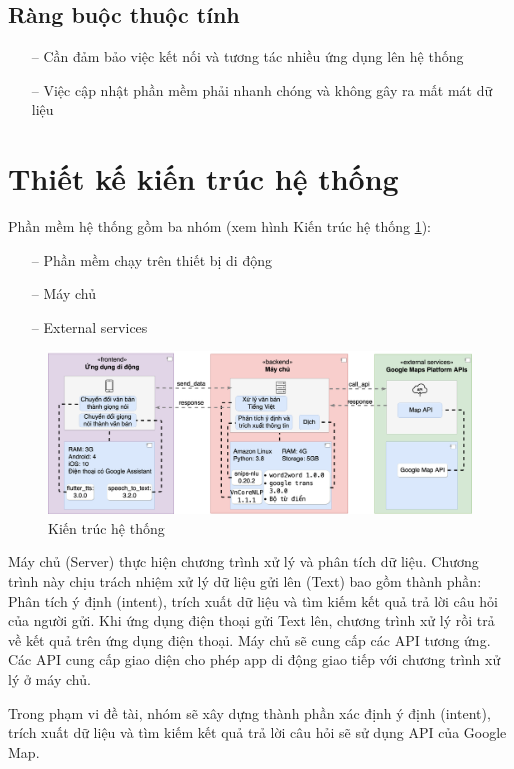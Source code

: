\subsection{Ràng buộc thuộc tính}
\begin{itemize}
    \item[--] Cần đảm bảo việc kết nối và tương tác nhiều ứng dụng lên hệ thống
    \item[--] Việc cập nhật phần mềm phải nhanh chóng và không gây ra mất mát dữ liệu
\end{itemize}

\section{Thiết kế kiến trúc hệ thống}
Phần mềm hệ thống gồm ba nhóm (xem hình Kiến trúc hệ thống \ref{fig:kien-truc-he-thong}):
\begin{itemize}
    \item[--] Phần mềm chạy trên thiết bị di động
    \item[--] Máy chủ
    \item[--] External services
\end{itemize}
\begin{figure}[htp]
    \centering
    \includegraphics[width=15cm]{images/Structure-System.png}
    \caption{Kiến trúc hệ thống}
    \label{fig:kien-truc-he-thong}
\end{figure}

Máy chủ (Server) thực hiện chương trình xử lý và phân tích dữ liệu. Chương trình này chịu trách nhiệm xử lý dữ liệu gửi lên (Text) bao gồm thành phần: Phân tích ý định (intent), trích xuất dữ liệu và tìm kiếm kết quả trả lời câu hỏi của người gửi. Khi ứng dụng điện thoại gửi Text lên, chương trình xử lý rồi trả về kết quả trên ứng dụng điện thoại. Máy chủ sẽ cung cấp các API tương ứng. Các API cung cấp giao diện cho phép app di động giao tiếp với chương trình xử lý ở máy chủ.

Trong phạm vi đề tài, nhóm sẽ xây dựng thành phần xác định ý định (intent), trích xuất dữ liệu và tìm kiếm kết quả trả lời câu hỏi sẽ sử dụng API của Google Map\cite{google-map}.

